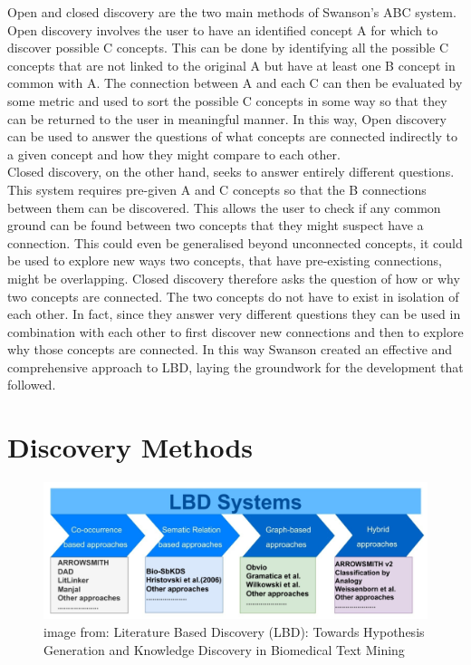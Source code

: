 \documentclass{l4proj}
\begin{document}
Open and closed discovery are the two main methods of Swanson's ABC system. Open discovery involves the user to have an identified concept A for which to discover possible C concepts. This can be done by identifying all the possible C concepts that are not linked to the original A but have at least one B concept in common with A. The connection between A and each C can then be evaluated by some metric and used to sort the possible C concepts in some way so that they can be returned to the user in meaningful manner. In this way, Open discovery can be used to answer the questions of what concepts are connected indirectly to a given concept and how they might compare to each other. \\

Closed discovery, on the other hand, seeks to answer entirely different questions. This system requires pre-given A and C concepts so that the B connections between them can be discovered. This allows the user to check if any common ground can be found between two concepts that they might suspect have a connection. This could even be generalised beyond unconnected concepts, it could be used to explore new ways two concepts, that have pre-existing connections, might be overlapping. Closed discovery therefore asks the question of how or why two concepts are connected. The two concepts do not have to exist in isolation of each other. In fact, since they answer very different questions they can be used in combination with each other to first discover new connections and then to explore why those concepts are connected. In this way Swanson created an effective and comprehensive approach to LBD, laying the groundwork for the development that followed. \\ 

\section{Discovery Methods}

\begin{figure}[h]
    \centering
    \includegraphics[width=\linewidth]{images/lbd_discovery_methods.png}
    \caption{image from: Literature Based Discovery (LBD): Towards Hypothesis Generation and Knowledge Discovery in Biomedical Text Mining}
    \label{fig:discovery_methods}
\end{figure}
\end{document}
